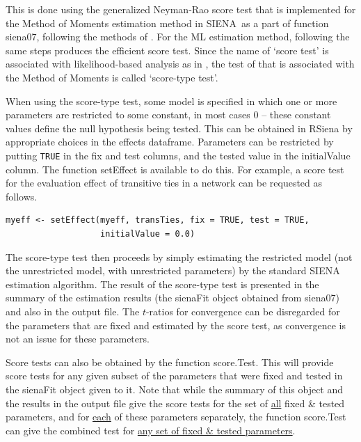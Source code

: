 \documentclass[a4paper,fleqn,11pt]{article}
\newcommand{\+}{\, + \,}
\newcommand{\sfn}[1]{\textsf{#1}}
\newcommand{\RS}{{\sf \textsf{RSiena} }}
\newcommand{\SI}{{\sf SIENA }}
\newcommand{\si}{{\sf SIENA}}
\begin{document}
This is done using the generalized Neyman-Rao score test
that is implemented for the Method of Moments estimation method
 in \si\ as a part of function \textsf{siena07}, following the methods
of \citet{Schweinberger12}.
For the ML estimation method,
following the same steps produces the \citet{Rao47} efficient score test.
Since the name of `score test' is associated with
likelihood-based analysis as in \citet{Rao47}, the test
of  \citet{Schweinberger12} that is associated with the Method of Moments
is called `score-type test'.

When using the score-type test, some model
is specified in which one or more parameters are restricted to some
constant, in most cases $0$ -- these constant values
define the null hypothesis being tested.
This can be obtained in \RS by appropriate choices in the effects dataframe.
Parameters can be restricted by
putting \texttt{TRUE} in the \sfn{fix} and \sfn{test} columns, and
the tested value in the \sfn{initialValue} column.
The function \textsf{setEffect} is available to do this.
For example, a score test for the evaluation effect of transitive ties
in a network can be requested as follows.
\begin{verbatim}
myeff <- setEffect(myeff, transTies, fix = TRUE, test = TRUE,
                   initialValue = 0.0)
\end{verbatim}

The score-type test then
proceeds by simply estimating the restricted model (not the unrestricted model,
with unrestricted parameters) by the standard \SI estimation algorithm.
The result of the score-type test is presented in the \sfn{summary}
of the estimation results (the \sfn{sienaFit} object obtained from
\sfn{siena07}) and also in the output file.
The $t$-ratios for convergence can be disregarded for the parameters
that are fixed and estimated by the score test, as convergence is not an issue
for these parameters.

Score tests can also be obtained by the function \sfn{score.Test}.
This will provide score tests for any given subset of the parameters
that were fixed and tested in the \sfn{sienaFit} object given to it.
Note that while the  \sfn{summary} of this object and the results
in the output file give the score tests for the set of \underline{all}
fixed \& tested parameters, and for \underline{each} of these parameters
separately, the function \sfn{score.Test} can give the combined test
for \underline{any set of fixed \& tested parameters}.
\end{document}
